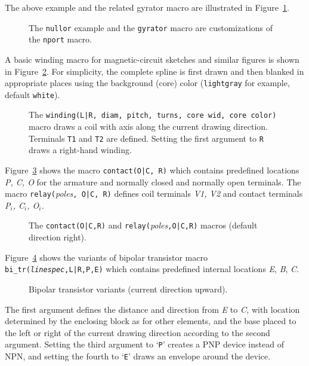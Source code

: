 The above example and the related gyrator macro are illustrated in
Figure~\ref{NLG}. 
\begin{figure}[h!t]
   
   \caption{The {\tt nullor} example and the {\tt gyrator}
    macro are customizations of the {\tt nport} macro.}
   \label{NLG}
   \end{figure}

\pagebreak
A basic winding macro for magnetic-circuit sketches and similar figures
is shown in Figure~\ref{Windings}.
For simplicity, the complete spline
is first drawn and then blanked in appropriate places using the background
(core) color (\verb!lightgray! for example, default \verb!white!).
\begin{figure}[h!]
 \vspace{-\baselineskip}
   
   \vspace{-1ex}
   \caption{The {\tt winding(L|R, diam, pitch, turns, core wid, core color)}
     macro draws a coil with axis along the current drawing direction.
     Terminals {\tt T1} and {\tt T2} are defined.
     Setting the first argument to {\tt R} draws a right-hand winding.}
   \label{Windings}
   \end{figure}
\enlargethispage{\baselineskip}

Figure~\ref{Relay} shows the macro {\tt contact(O|C, R)}
which contains predefined locations {\sl P, C, O}
for the armature and normally closed and normally
open terminals.  The macro {\tt relay(}{\sl poles}{\tt, O|C, R)}
defines coil terminals {\sl V1, V2} and contact
terminals {\sl P$_i$, C$_i$, O$_i$.} 
\begin{figure}[ht]
   
   \vspace{-1ex}
   \caption{The {\tt contact(O|C,R)} and {\tt relay(}{\sl poles}{\tt,O|C,R)}
     macros (default direction right).}
   \label{Relay}
   \end{figure}

Figure~\ref{Bip} shows the variants of bipolar transistor macro
{\tt bi\_tr({\sl linespec},L|R,P,E)}
which contains predefined internal locations {\sl E},
{\sl B}, {\sl C}.
\begin{figure}[b!]
   
   \caption{Bipolar transistor variants (current direction upward).}
   \label{Bip}
   \end{figure}
The first argument defines the distance and direction
from {\sl E} to {\sl C,} with location determined by the enclosing
block as for other elements, and the base placed to the left or right of the
current drawing direction according to the second argument.  Setting the third
argument to `{\tt P}' creates a PNP device instead of NPN, and setting the
fourth to `{\tt E}' draws an envelope around the device.

